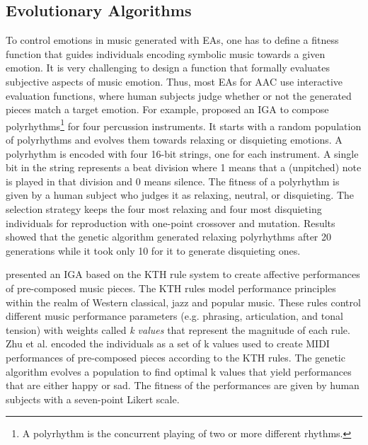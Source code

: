\subsection{Evolutionary Algorithms}

To control emotions in music generated with EAs, one has to define a fitness function that guides individuals encoding symbolic music towards a given emotion. It is very challenging to design a function that formally evaluates subjective aspects of music emotion. Thus, most EAs for AAC use interactive evaluation functions, where human subjects judge whether or not the generated pieces match a target emotion.
For example, \citet{kim2004composing} proposed an IGA to compose polyrhythms\footnote{A polyrhythm is the concurrent playing of two or more different rhythms.} for four percussion instruments. It starts with a random population of polyrhythms and evolves them towards relaxing or disquieting emotions. A polyrhythm is encoded with four 16-bit strings, one for each instrument. A single bit in the string represents a beat division where 1 means that a (unpitched) note is played in that division and 0 means silence. The fitness of a polyrhythm is given by a human subject who judges it as relaxing, neutral, or disquieting. The selection strategy keeps the four most relaxing and four most disquieting individuals for reproduction with one-point crossover and mutation. Results showed that the genetic algorithm generated relaxing polyrhythms after 20 generations while it took only 10 for it to generate disquieting ones.

\citet{zhu2008emotional} presented an IGA based on the KTH rule system \cite{friberg2006overview} to create affective performances of pre-composed music pieces. The KTH rules model performance principles within the realm of Western classical, jazz and popular music. These rules control different music performance parameters (e.g. phrasing, articulation, and tonal tension) with weights called \textit{k values} that represent the magnitude of each rule. Zhu et al. \cite{zhu2008emotional} encoded the individuals as a set of k values used to create MIDI performances of pre-composed pieces according to the KTH rules. The genetic algorithm evolves a population to find optimal k values that yield performances that are either happy or sad. The fitness of the performances are given by human subjects with a seven-point Likert scale.

